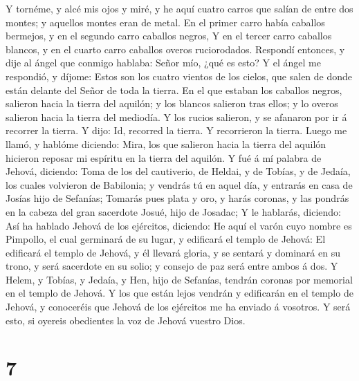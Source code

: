  Y tornéme, y alcé mis ojos y miré, y he aquí cuatro carros
que salían de entre dos montes; y aquellos montes eran de metal.
 En el primer carro había caballos bermejos, y en el segundo
carro caballos negros,  Y en el tercer carro caballos
blancos, y en el cuarto carro caballos overos ruciorodados. 
Respondí entonces, y dije al ángel que conmigo hablaba: Señor mío, ¿qué
es esto?  Y el ángel me respondió, y díjome: Estos son los
cuatro vientos de los cielos, que salen de donde están delante del Señor
de toda la tierra.  En el que estaban los caballos negros,
salieron hacia la tierra del aquilón; y los blancos salieron tras ellos;
y lo overos salieron hacia la tierra del mediodía.  Y los
rucios salieron, y se afanaron por ir á recorrer la tierra. Y dijo: Id,
recorred la tierra. Y recorrieron la tierra.  Luego me
llamó, y hablóme diciendo: Mira, los que salieron hacia la tierra del
aquilón hicieron reposar mi espíritu en la tierra del aquilón.
 Y fué á mí palabra de Jehová, diciendo:  Toma
de los del cautiverio, de Heldai, y de Tobías, y de Jedaía, los cuales
volvieron de Babilonia; y vendrás tú en aquel día, y entrarás en casa de
Josías hijo de Sefanías;  Tomarás pues plata y oro, y harás
coronas, y las pondrás en la cabeza del gran sacerdote Josué, hijo de
Josadac;  Y le hablarás, diciendo: Así ha hablado Jehová de
los ejércitos, diciendo: He aquí el varón cuyo nombre es Pimpollo, el
cual germinará de su lugar, y edificará el templo de Jehová:
 El edificará el templo de Jehová, y él llevará gloria, y
se sentará y dominará en su trono, y será sacerdote en su solio; y
consejo de paz será entre ambos á dos.  Y Helem, y Tobías,
y Jedaía, y Hen, hijo de Sefanías, tendrán coronas por memorial en el
templo de Jehová.  Y los que están lejos vendrán y
edificarán en el templo de Jehová, y conoceréis que Jehová de los
ejércitos me ha enviado á vosotros. Y será esto, si oyereis obedientes
la voz de Jehová vuestro Dios.

\hypertarget{section-6}{%
\section{7}\label{section-6}}

